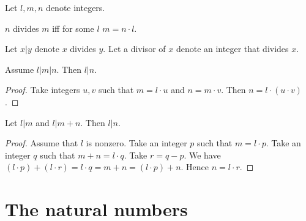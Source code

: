\documentclass{article}
\begin{document}
\begin{forthel}

Let $l,m,n$ denote integers.

\begin{definition}
$n$ divides $m$ iff for some $l$ $m = n \cdot l$.
\end{definition}

Let $x | y$ denote $x$ divides $y$.
Let a divisor of $x$ denote an integer that divides $x$.

\begin{lemma}
Assume $l | m | n$.
Then $l | n$.
\end{lemma}
\begin{proof}
Take integers $u,v$ such that $m = l \cdot u$ and $n = m \cdot v$.
Then $n = l \cdot (u \cdot v)$.
\end{proof}

\begin{lemma}
Let $l | m$ and $l | m + n$.
Then $l | n$.
\end{lemma}
\begin{proof}
Assume that $l$ is nonzero.
Take an integer $p$ such that $m = l \cdot p$.
Take an integer $q$ such that $m + n = l \cdot q$.
Take $r = q - p$.
We have $(l \cdot p) + (l \cdot r) = l \cdot q = m + n = (l \cdot p) + n$.
Hence $n = l \cdot r$.
\end{proof}



\end{forthel}


\section{The natural numbers}
\end{document}
